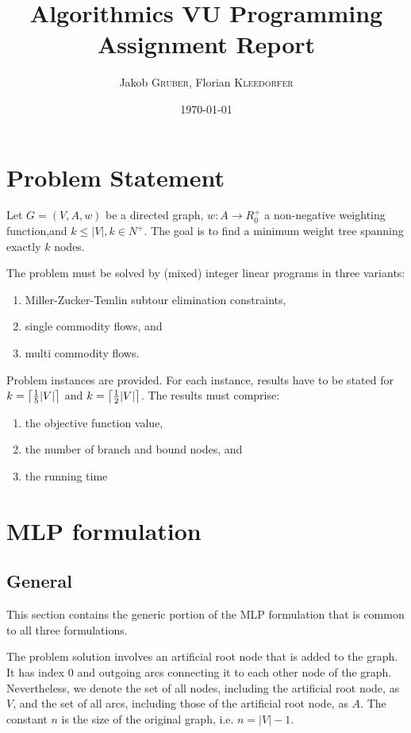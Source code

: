 \documentclass{article}
\title{Algorithmics VU Programming Assignment Report}
\author{Jakob \textsc{Gruber}, Florian \textsc{Kleedorfer}}
\date{\today}
\DeclarePairedDelimiter{\ceil}{\lceil}{\rceil}
\begin{document}
\maketitle

\section{Problem Statement}

Let $G=(V,A,w)$ be a directed graph, $w: A \rightarrow R_0^+$ a non-negative weighting function,and $k \leq |V|, k \in N^+$. The goal is to find a minimum weight tree spanning exactly $k$ nodes.

The problem must be solved by (mixed) integer linear programs in three variants:
\begin{enumerate}
	\item Miller-Zucker-Temlin subtour elimination constraints,
	\item single commodity flows, and
	\item multi commodity flows.
\end{enumerate}
Problem instances are provided. For each instance, results have to be stated for $k = \ceil[\big]{\frac{1}{5}|V|}$ and  $k = \ceil[\big]{\frac{1}{2}|V|}$. The results must comprise:
\begin{enumerate}
\item the objective function value,
\item the number of branch and bound nodes, and
\item the running time
\end{enumerate}

\section{MLP formulation} 
\subsection{General}
This section contains the generic portion of the MLP formulation that is common to all three formulations.

The problem solution involves an artificial root node that is added to the graph. It has index 0 and outgoing arcs connecting it to each other node of the graph. Nevertheless, we denote the set of all nodes, including the artificial root node, as $V$, and the set of all arcs, including those of the artificial root node, as $A$. The constant $n$ is the size of the original graph, i.e. $n = |V| - 1$.
\end{document}
